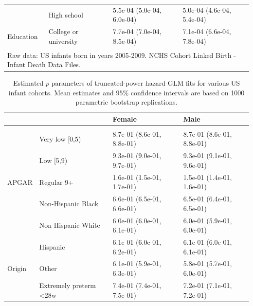 \documentclass[10pt, twoside, parskip=half]{article}
\begin{document}
\begin{table}[t]
\begin{tabular}{llll}
 & High school & 5.5e-04 (5.0e-04, 6.0e-04) & 5.0e-04 (4.6e-04, 5.4e-04)\\

\multirow{-3}{*}{\raggedright\arraybackslash \hspace{1em}Education} & College or university & 7.7e-04 (7.0e-04, 8.5e-04) & 7.1e-04 (6.6e-04, 7.8e-04)\\
\bottomrule
\multicolumn{4}{l}{\textsuperscript{} Raw data: US infants born in years 2005-2009. NCHS Cohort Linked Birth - Infant Death Data Files.}\\
\end{tabular}
\end{table}

\clearpage

\begin{table}[t]

\caption{\label{tab:tab-ci-p}Estimated $p$ parameters of truncated-power hazard GLM fits for various US infant cohorts. Mean estimates and $95\%$ confidence intervals are based on 1000 parametric bootstrap replications.}
\centering
\begin{tabular}{llll}
\toprule
\textbf{} & \textbf{} & \textbf{Female} & \textbf{Male}\\
\midrule
\addlinespace[0.3em]
\multicolumn{4}{l}{\textbf{1995-1999}}\\
 & Very low [0,5) & 8.7e-01 (8.6e-01, 8.8e-01) & 8.7e-01 (8.6e-01, 8.8e-01)\\

 & Low [5,9) & 9.3e-01 (9.0e-01, 9.7e-01) & 9.3e-01 (9.1e-01, 9.6e-01)\\

\multirow{-3}{*}{\raggedright\arraybackslash \hspace{1em}APGAR} & Regular 9+ & 1.6e-01 (1.5e-01, 1.7e-01) & 1.5e-01 (1.4e-01, 1.6e-01)\\
\cmidrule{1-4}
 & Non-Hispanic Black & 6.6e-01 (6.5e-01, 6.6e-01) & 6.5e-01 (6.4e-01, 6.5e-01)\\

 & Non-Hispanic White & 6.0e-01 (6.0e-01, 6.1e-01) & 6.0e-01 (5.9e-01, 6.0e-01)\\

 & Hispanic & 6.1e-01 (6.0e-01, 6.2e-01) & 6.1e-01 (6.0e-01, 6.1e-01)\\

\multirow{-4}{*}{\raggedright\arraybackslash \hspace{1em}Origin} & Other & 6.1e-01 (5.9e-01, 6.3e-01) & 5.8e-01 (5.7e-01, 6.0e-01)\\
\cmidrule{1-4}
 & Extremely preterm <28w & 7.4e-01 (7.4e-01, 7.5e-01) & 7.2e-01 (7.1e-01, 7.2e-01)\\


\end{tabular}
\end{table}
\end{document}
